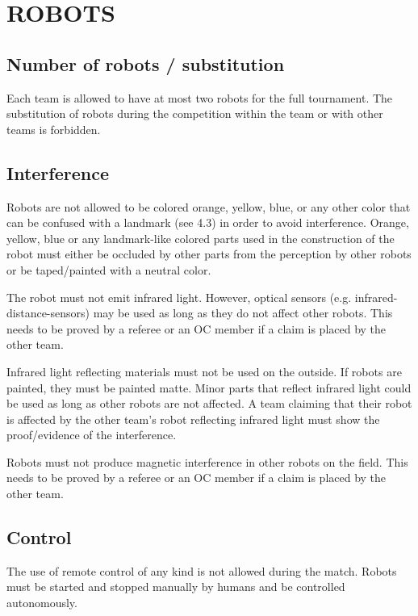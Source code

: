 \documentclass{article}
\begin{document}
\section{ROBOTS\label{ref-018}}

\subsection{ Number of robots / substitution \label{ref-019}}

Each team is allowed to have at most two robots for the full tournament. The
substitution of robots during the competition within the team or with other
teams is forbidden.

\subsection{ Interference \label{ref-020}}

Robots are not allowed to be colored orange, yellow, blue, or any other color
that can be confused with a landmark (see 4.3) in order to avoid interference.
Orange, yellow, blue or any landmark-like colored parts used in the
construction of the robot must either be occluded by other parts from the
perception by other robots or be taped/painted with a neutral color.

The robot must not emit infrared light. However, optical sensors (e.g.
infrared-distance-sensors) may be used as long as they do not affect other
robots. This needs to be proved by a referee or an OC member if a claim is
placed by the other team.

Infrared light reflecting materials must not be used on the outside. If robots
are painted, they must be painted matte. Minor parts that reflect infrared
light could be used as long as other robots are not affected. A team claiming
that their robot is affected by the other team's robot reflecting infrared
light must show the proof/evidence of the interference.

Robots must not produce magnetic interference in other robots on the field.
This needs to be proved by a referee or an OC member if a claim is placed by
the other team.

\subsection{ Control \label{ref-021}}

The use of remote control of any kind is not allowed during the match. Robots
must be started and stopped manually by humans and be controlled autonomously.
\end{document}
